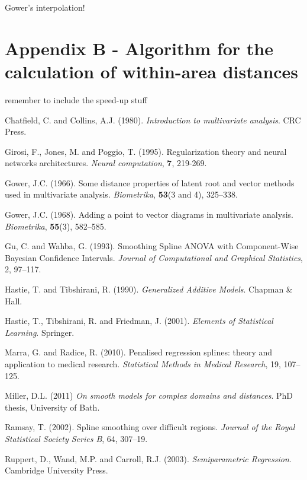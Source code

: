 \documentclass[useAMS,referee]{biom}
\begin{document}
Gower's interpolation!


\section*{Appendix B - Algorithm for the calculation of within-area distances}

remember to include the speed-up stuff






\begin{thebibliography}{99}

\bibitem{} Chatfield, C. and Collins, A.J. (1980). \textit{Introduction to multivariate analysis}. CRC Press.

\bibitem{} Girosi, F., Jones, M. and Poggio, T. (1995). Regularization theory and neural networks architectures. \textit{Neural computation}, \textbf{7}, 219-269.

\bibitem{} Gower, J.C. (1966). Some distance properties of latent root and vector methods used in multivariate analysis. \textit{Biometrika}, \textbf{53}(3 and 4), 325--338.

\bibitem{} Gower, J.C. (1968). Adding a point to vector diagrams in multivariate analysis. \textit{Biometrika}, \textbf{55}(3), 582--585.

\bibitem{} Gu, C. and Wahba, G. (1993). Smoothing Spline ANOVA with Component-Wise Bayesian Confidence Intervals. \textit{Journal of Computational and Graphical Statistics}, 2, 97--117.

\bibitem{} Hastie, T. and Tibshirani, R. (1990). \textit{Generalized Additive Models}. Chapman \& Hall.

\bibitem{} Hastie, T., Tibshirani, R. and Friedman, J. (2001). \textit{Elements of Statistical Learning}. Springer.

\bibitem{} Marra, G. and Radice, R. (2010). Penalised regression splines: theory and application to medical research. \textit{Statistical Methods in Medical Research}, 19, 107--125.

\bibitem{} Miller, D.L. (2011) \textit{On smooth models for complex domains and distances}. PhD thesis, University of Bath.

\bibitem{} Ramsay, T. (2002). Spline smoothing over difficult regions. \textit{Journal of the Royal Statistical Society Series B}, 64, 307--19.

\bibitem{} Ruppert, D., Wand, M.P. and Carroll, R.J. (2003). \textit{Semiparametric Regression}. Cambridge University Press.


\end{thebibliography}
\end{document}
